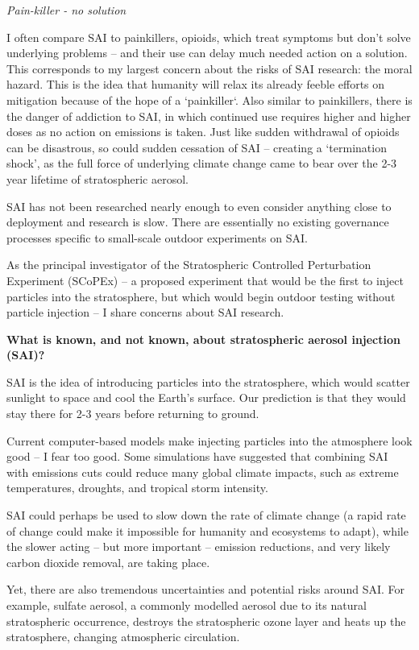 \documentclass[
]{book}
\begin{document}
\emph{Pain-killer - no solution}

I often compare SAI to painkillers, opioids, which treat symptoms but don't solve underlying problems -- and their use can delay much needed action on a solution.
This corresponds to my largest concern about the risks of SAI research: the moral hazard. This is the idea that humanity will relax its already feeble efforts on mitigation because of the hope of a `painkiller`.
Also similar to painkillers, there is the danger of addiction to SAI, in which continued use requires higher and higher doses as no action on emissions is taken. Just like sudden withdrawal of opioids can be disastrous, so could sudden cessation of SAI -- creating a `termination shock', as the full force of underlying climate change came to bear over the 2-3 year lifetime of stratospheric aerosol.

SAI has not been researched nearly enough to even consider anything close to deployment and research is slow. There are essentially no existing governance processes specific to small-scale outdoor experiments on SAI.

As the principal investigator of the Stratospheric Controlled Perturbation Experiment (SCoPEx) -- a proposed experiment that would be the first to inject particles into the stratosphere, but which would begin outdoor testing without particle injection -- I share concerns about SAI research.

\textbf{What is known, and not known, about stratospheric aerosol injection (SAI)?}

SAI is the idea of introducing particles into the stratosphere, which would scatter sunlight to space and cool the Earth's surface. Our prediction is that they would stay there for 2-3 years before returning to ground.

Current computer-based models make injecting particles into the atmosphere look good -- I fear too good. Some simulations have suggested that combining SAI with emissions cuts could reduce many global climate impacts, such as extreme temperatures, droughts, and tropical storm intensity.

SAI could perhaps be used to slow down the rate of climate change (a rapid rate of change could make it impossible for humanity and ecosystems to adapt), while the slower acting -- but more important -- emission reductions, and very likely carbon dioxide removal, are taking place.

Yet, there are also tremendous uncertainties and potential risks around SAI. For example, sulfate aerosol, a commonly modelled aerosol due to its natural stratospheric occurrence, destroys the stratospheric ozone layer and heats up the stratosphere, changing atmospheric circulation.
\end{document}
